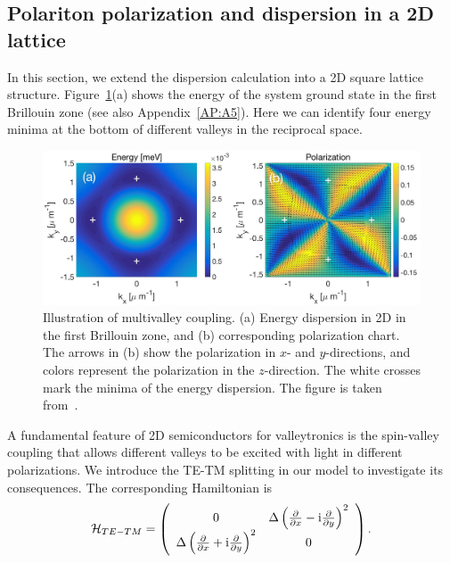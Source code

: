 \subsection{Polariton polarization and dispersion in a 2D lattice}
In this section, we extend the dispersion calculation into a 2D square lattice structure.
Figure~\ref{fig:CH2_Fig2D}(a) shows the energy of the system ground state in the first Brillouin zone (see also Appendix~\ref{AP:A5}).
Here we can identify four energy minima at the bottom of different valleys in the reciprocal space.
%
%
%
\begin{figure}[ht]
	\includegraphics[width=0.99\linewidth]{Fig/Ch2/Fig5.jpg}
\caption[Illustration of multivalley coupling]{Illustration of multivalley coupling. (a) Energy dispersion in 2D in the first Brillouin zone, and (b) corresponding polarization chart. The arrows in (b) show the polarization in $x$- and $y$-directions, and colors represent the polarization in the $z$-direction. The white crosses mark the minima of the energy dispersion. The figure is taken from~\cite{Sun:2017ab}.}
\label{fig:CH2_Fig2D}
\end{figure}
%
%
%
A fundamental feature of 2D semiconductors for valleytronics is the spin-valley coupling that allows different valleys to be excited with light in different polarizations.
We introduce the TE-TM splitting in our model to investigate its consequences. The corresponding Hamiltonian is
%
\begin{equation}
\label{eq:CH2_TE_TM}
\mathcal{H}_{TE-TM}=\left(\begin{array}{cc}0&\Delta\left(\frac{\partial}{\partial x}-\mathrm{i}\frac{\partial}{\partial y}\right)^2\\\Delta\left(\frac{\partial}{\partial x}+\mathrm{i}\frac{\partial}{\partial y}\right)^2&0\end{array}\right).
\end{equation}
%

